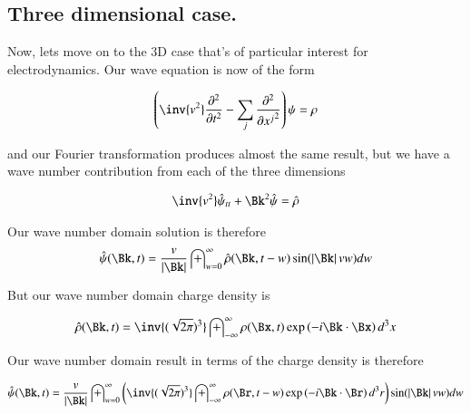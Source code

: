 \documentclass{article}
\newcommand{\PDSq}[2]{\frac{\partial^2 {#2}}{\partial {#1}^2}}
\newcommand{\IIinf}[0]{ \int_{-\infty}^\infty }
\begin{document}

\subsection{ Three dimensional case. }

Now, lets move on to the 3D case that's of particular interest for electrodynamics.  Our wave equation is now of the form

\begin{align}
\left( \inv{v^2} \PDSq{t}{} -\sum_j \PDSq{x^j}{} \right)\psi = \rho
\end{align}

and our Fourier transformation produces almost the same result, but we have a wave number contribution from each of the three dimensions

\begin{align}
\inv{v^2}\hat{\psi}_{tt} + \Bk^2 \hat{\psi} = \hat{\rho}
\end{align}

Our wave number domain solution is therefore
\begin{align*}
\hat{\psi}(\Bk, t) = \frac{v}{\Abs{\Bk}} \int_{w = 0}^\infty \hat{\rho}(\Bk, t-w) \sin( \Abs{\Bk} v w ) dw
\end{align*}

But our wave number domain charge density is

\begin{align*}
\hat{\rho}(\Bk, t) &= \inv{(\sqrt{2\pi})^3} \IIinf \rho(\Bx, t) \exp\left( -i \Bk \cdot \Bx \right) d^3 x \\
\end{align*}

Our wave number domain result in terms of the charge density is therefore

\begin{align*}
\hat{\psi}(\Bk, t) = 
\frac{v}{\Abs{\Bk}} \int_{w = 0}^\infty 
\left(
\inv{(\sqrt{2\pi})^3} \IIinf \rho(\Br, t-w) \exp\left( -i \Bk \cdot \Br \right) d^3 r 
\right)
\sin( \Abs{\Bk} v w ) dw
\end{align*}
\end{document}
